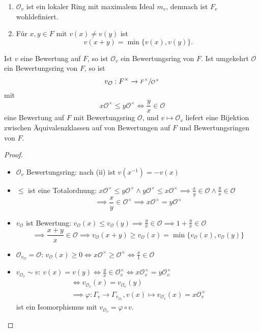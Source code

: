 \begin{bemerkungnr}
    \begin{enumerate}[label=\alph*)]
        \item $\mathcal{O}_v$ ist ein lokaler Ring mit maximalem Ideal $m_v$, demnach ist 
        $F_v$ wohldefiniert.

        \item Für $x,y \in F$ mit $v(x) \ne v(y)$ ist
        $$ v(x+y) = \min\{v(x),v(y)\}.$$
    \end{enumerate}
\end{bemerkungnr}

\begin{satz}
    Ist $v$ eine Bewertung auf $F$, so ist $\mathcal{O}_v$ ein Bewertungsring von $F$.
    Ist umgekehrt $\mathcal{O}$ ein Bewertungsring von $F$, so ist 
    $$ v_\mathcal{O}: F^\times \to \sfrac{F^\times}{\mathcal{O}^\times}$$
    mit
    $$ x \mathcal{O}^\times \leq y \mathcal{O}^\times \iff \frac{y}{x} \in \mathcal{O}$$
    eine Bewertung auf $F$ mit Bewertungsring $\mathcal{O}$, und
    $ v \mapsto \mathcal{O}_v$ liefert eine Bijektion zwischen Äquivalenzklassen auf von 
    Bewertungen auf $F$ und Bewertungsringen von $F$.
\end{satz}
\begin{proof}
    \begin{itemize}
        \item $\mathcal{O}_v$ Bewertungsring: nach (ii) ist $v(x^{-1}) = -v(x)$
        \item $\leq$ ist eine Totalordnung:
            $x \mathcal{O}^\times \leq y \mathcal{O}^\times \land y \mathcal{O}^\times \leq x \mathcal{O}^\times \implies \frac{x}{y} \in \mathcal{O} \land \frac{y}{x} \in \mathcal{O}$
            $$\implies \frac{x}{y} \in \mathcal{O}^\times \implies x \mathcal{O}^\times = y \mathcal{O}^\times$$
        \item $v_\mathcal{O}$ ist Bewertung: 
            $v_\mathcal{O}(x) \leq v_\mathcal{O}(y) \implies \frac{y}{x} \in \mathcal{O} 
            \implies 1 + \frac{y}{x} \in \mathcal{O}$
            $$\implies \frac{x+y}{x} \in \mathcal{O} \implies v_\mathcal{O}(x+y) \geq v_\mathcal{O}(x) = \min\{v_\mathcal{O}(x), v_\mathcal{O}(y)\}$$
        \item $\mathcal{O}_{v_\mathcal{O}} = \mathcal{O}$:
            $v_\mathcal{O}(x) \geq 0 \iff x \mathcal{O}^\times \geq \mathcal{O}^\times
            \iff \frac{x}{1} \in \mathcal{O}$
        \item $v_{\mathcal{O}_v} \sim v$: $v(x) = v(y) \iff \frac{y}{x} \in \mathcal{O}_v^\times \iff x \mathcal{O}_v^\times = y \mathcal{O}_v^\times$
        \begin{align*}
            \iff v_{\mathcal{O}_v}(x) = v_{\mathcal{O}_v}(y)\\
            \implies \varphi: \Gamma_v \to \Gamma_{v_{\mathcal{O}_v}}, v(x) \mapsto v_{\mathcal{O}_v}(x) = x \mathcal{O}_v^\times
        \end{align*}
        ist ein Isomorphismus mit $v_{\mathcal{O}_v} = \varphi \circ v$.
    \end{itemize}
\end{proof}

